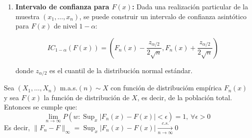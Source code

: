 \begin{proposición}
\begin{enumerate}
\begin{enumerate}
	      \end{enumerate}

	\item \textbf{Intervalo de confianza para \( F(x) \):}
	      Dada una realización particular de la muestra \( (x_1, \dots, x_n) \), se puede construir un intervalo de confianza asintótico para \( F(x) \) de nivel \( 1 - \alpha \):

	      $$ IC_{1-\alpha}(F(x)) = \left( F_n(x) - \frac{z_{\alpha/2}}{2\sqrt{n}}, F_n(x) + \frac{z_{\alpha/2}}{2\sqrt{n}} \right) $$

	      donde \( z_{\alpha/2} \) es el cuantil de la distribución normal estándar.

\end{enumerate}
\end{proposición}

\begin{teorema}
	Sea $\left(X_{1}, \ldots, X_{n}\right)$ m.a.s.$(n) \sim X$ con función de distribucióm empírica $F_{n}(x)$ y sea $F(x)$ la función de distribución de $X$, es decir, de la población total. Entonces se cumple que:
	\[\lim _{n \rightarrow \infty} P\left(w: \operatorname{Sup}_{x}\left|F_{n}(x)-F(x)\right|<\epsilon\right)=1, \ \forall \epsilon>0\]
	Es decir, $\lVert F_{n}-F \rVert_{\infty} =
		\operatorname{Sup}_{x}\left|F_{n}(x)-F(x)\right| \xrightarrow[n \rightarrow
			\infty]{c.s.} 0$
\end{teorema}


